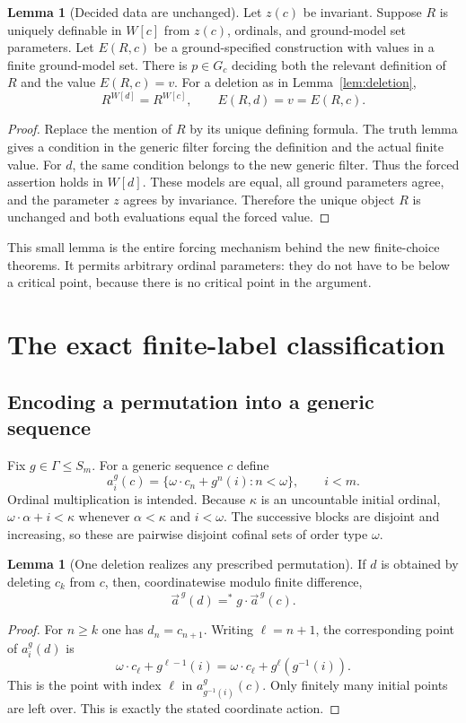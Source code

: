 \documentclass[11pt,letterpaper]{article}
\theoremstyle{definition}
\newtheorem{lemma}[definition]{Lemma}
\numberwithin{equation}{section}
\begin{document}
\begin{lemma}[Decided data are unchanged]\label{lem:decided}
Let $z(c)$ be invariant. Suppose $R$ is uniquely definable in $W[c]$ from $z(c)$, ordinals, and ground-model set parameters. Let $E(R,c)$ be a ground-specified construction with values in a finite ground-model set. There is $p\in G_c$ deciding both the relevant definition of $R$ and the value $E(R,c)=v$. For a deletion as in Lemma~\ref{lem:deletion},
\[
 R^{W[d]}=R^{W[c]},\qquad E(R,d)=v=E(R,c).
\]
\end{lemma}
\begin{proof}
Replace the mention of $R$ by its unique defining formula. The truth lemma gives a condition in the generic filter forcing the definition and the actual finite value. For $d$, the same condition belongs to the new generic filter. Thus the forced assertion holds in $W[d]$. These models are equal, all ground parameters agree, and the parameter $z$ agrees by invariance. Therefore the unique object $R$ is unchanged and both evaluations equal the forced value.
\end{proof}

This small lemma is the entire forcing mechanism behind the new finite-choice theorems. It permits arbitrary ordinal parameters: they do not have to be below a critical point, because there is no critical point in the argument.

\section{The exact finite-label classification}\label{sec:labels}

\subsection{Encoding a permutation into a generic sequence}

Fix $g\in\Gamma\le S_m$. For a generic sequence $c$ define
\begin{equation}\label{eq:twist}
 a_i^g(c)=\{\omega\cdot c_n+g^n(i):n<\omega\},\qquad i<m.
\end{equation}
Ordinal multiplication is intended. Because $\kappa$ is an uncountable initial ordinal, $\omega\cdot\alpha+i<\kappa$ whenever $\alpha<\kappa$ and $i<\omega$. The successive blocks are disjoint and increasing, so these are pairwise disjoint cofinal sets of order type $\omega$.

\begin{lemma}[One deletion realizes any prescribed permutation]\label{lem:twist}
If $d$ is obtained by deleting $c_k$ from $c$, then, coordinatewise modulo finite difference,
\[
 \vec a^{\,g}(d)=^*g\cdot\vec a^{\,g}(c).
\]
\end{lemma}
\begin{proof}
For $n\ge k$ one has $d_n=c_{n+1}$. Writing $\ell=n+1$, the corresponding point of $a_i^g(d)$ is
\[
 \omega\cdot c_\ell+g^{\ell-1}(i)
   =\omega\cdot c_\ell+g^\ell(g^{-1}(i)).
\]
This is the point with index $\ell$ in $a_{g^{-1}(i)}^g(c)$. Only finitely many initial points are left over. This is exactly the stated coordinate action.
\end{proof}
\end{document}
